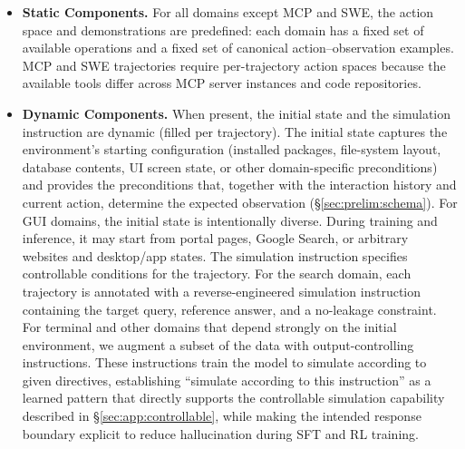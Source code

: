 \documentclass{llmxive}
\begin{document}
\begin{itemize}[leftmargin=1.5em,itemsep=2pt]
\item \textbf{Static Components.}
For all domains except MCP and SWE, the action space and demonstrations are predefined: each domain has a fixed set of available operations and a fixed set of canonical action--observation examples.
MCP and SWE trajectories require per-trajectory action spaces because the available tools differ across MCP server instances and code repositories.
\item \textbf{Dynamic Components.}
When present, the initial state and the simulation instruction are dynamic (filled per trajectory).
The initial state captures the environment's starting configuration (installed packages, file-system layout, database contents, UI screen state, or other domain-specific preconditions) and provides the preconditions that, together with the interaction history and current action, determine the expected observation (\S\ref{sec:prelim:schema}).
For GUI domains, the initial state is intentionally diverse.
During training and inference, it may start from portal pages, Google Search, or arbitrary websites and desktop/app states.
The simulation instruction specifies controllable conditions for the trajectory.
For the search domain, each trajectory is annotated with a reverse-engineered simulation instruction containing the target query, reference answer, and a no-leakage constraint.
For terminal and other domains that depend strongly on the initial environment, we augment a subset of the data with output-controlling instructions.
These instructions train the model to simulate according to given directives, establishing ``simulate according to this instruction'' as a learned pattern that directly supports the controllable simulation capability described in \S\ref{sec:app:controllable}, while making the intended response boundary explicit to reduce hallucination during SFT and RL training.
\end{itemize}
\end{document}
